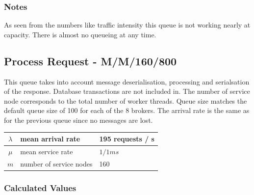 \documentclass[a4paper]{article}
\begin{document}

\subsubsection{Notes}

As seen from the numbers like traffic  intensity this queue is not working nearly at capacity. There is almost no queueing at any time.

\subsection{Process Request - M/M/160/800}
This queue takes into account message deserialisation, processing and serialsation of the response. Database transactions are not included in. The number of service node corresponds to the total number of worker threads. Queue size matches the default queue size of 100 for each of the 8 brokers. The arrival rate is the same as for the previous queue since no messages are lost.\\

\begin{tabular}{|c|l|l|}
\hline 
$\lambda$ & mean arrival rate & 195 requests / s \\ 
\hline 
$\mu$ & mean service rate & $1/1ms$ \\ 
\hline 
$m$ & number of service nodes & 160 \\ 
\hline 
\end{tabular} 

\subsubsection{Calculated Values}

\end{document}

